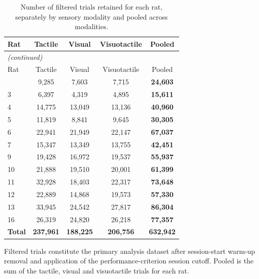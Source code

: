 \begin{longtable}{lcccc}
\caption{Number of filtered trials retained for each rat, separately by sensory modality and pooled across modalities.}
\label{tab:s1-filtered-trial-counts} \\
\toprule
Rat & Tactile & Visual & Visuotactile & Pooled \\
\midrule
\endfirsthead
\multicolumn{5}{l}{\textit{(continued)}} \\
\toprule
Rat & Tactile & Visual & Visuotactile & Pooled \\
\midrule
\endhead
\bottomrule
\endfoot
\bottomrule
\endlastfoot
2 & 9,285 & 7,603 & 7,715 & \textbf{24,603} \\
3 & 6,397 & 4,319 & 4,895 & \textbf{15,611} \\
4 & 14,775 & 13,049 & 13,136 & \textbf{40,960} \\
5 & 11,819 & 8,841 & 9,645 & \textbf{30,305} \\
6 & 22,941 & 21,949 & 22,147 & \textbf{67,037} \\
7 & 15,347 & 13,349 & 13,755 & \textbf{42,451} \\
9 & 19,428 & 16,972 & 19,537 & \textbf{55,937} \\
10 & 21,888 & 19,510 & 20,001 & \textbf{61,399} \\
11 & 32,928 & 18,403 & 22,317 & \textbf{73,648} \\
12 & 22,889 & 14,868 & 19,573 & \textbf{57,330} \\
13 & 33,945 & 24,542 & 27,817 & \textbf{86,304} \\
16 & 26,319 & 24,820 & 26,218 & \textbf{77,357} \\
\textbf{Total} & \textbf{237,961} & \textbf{188,225} & \textbf{206,756} & \textbf{632,942} \\
\end{longtable}
\vspace{4pt}
\par\noindent
\begin{minipage}{\linewidth}\small Filtered trials constitute the primary analysis dataset after session-start warm-up removal and application of the performance-criterion session cutoff. Pooled is the sum of the tactile, visual and visuotactile trials for each rat.\end{minipage}
